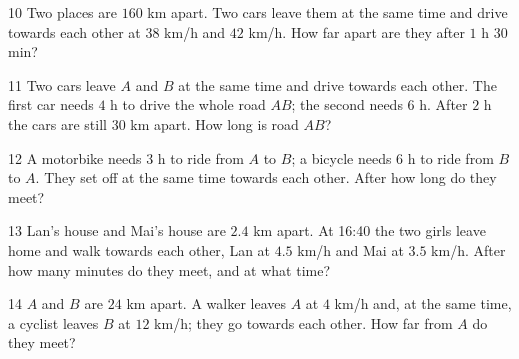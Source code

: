 \gap
\begin{probbox}{10}{\relax}
Two places are $160$ km apart. Two cars leave them at the same time and drive towards each other at $38$ km/h and $42$ km/h. How far apart are they after $1$ h $30$ min?
\end{probbox}
\gap
\begin{probbox}{11}{\relax}
Two cars leave $A$ and $B$ at the same time and drive towards each other. The first car needs $4$ h to drive the whole road $AB$; the second needs $6$ h. After $2$ h the cars are still $30$ km apart. How long is road $AB$?
\end{probbox}
\gap
\begin{probbox}{12}{\relax}
A motorbike needs $3$ h to ride from $A$ to $B$; a bicycle needs $6$ h to ride from $B$ to $A$. They set off at the same time towards each other. After how long do they meet?
\end{probbox}
\gap
\begin{probbox}{13}{\relax}
Lan's house and Mai's house are $2.4$ km apart. At 16:40 the two girls leave home and walk towards each other, Lan at $4.5$ km/h and Mai at $3.5$ km/h. After how many minutes do they meet, and at what time?
\end{probbox}
\gap
\begin{probbox}{14}{\relax}
$A$ and $B$ are $24$ km apart. A walker leaves $A$ at $4$ km/h and, at the same time, a cyclist leaves $B$ at $12$ km/h; they go towards each other. How far from $A$ do they meet?
\end{probbox}
